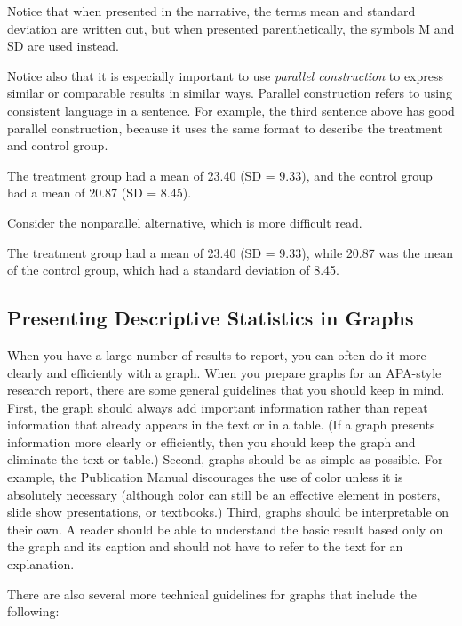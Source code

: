 Notice that when presented in the narrative, the terms mean and standard deviation are written out, but when presented parenthetically, the symbols M and SD are used instead. 

Notice also that it is especially important to use \emph{parallel construction} to express similar or comparable results in similar ways. Parallel construction refers to using consistent language in a sentence. For example, the third sentence above has good parallel construction, because it uses the same format to describe the treatment and control group.

\begin{kframe}
The treatment group had a mean of 23.40 (SD = 9.33), and the control group had a mean of 20.87 (SD = 8.45).
\end{kframe}

Consider the nonparallel alternative, which is more difficult read.

\begin{kframe}
The treatment group had a mean of 23.40 (SD = 9.33), while 20.87 was the mean of the control group, which had a standard deviation of 8.45.
\end{kframe}

\subsection{Presenting Descriptive Statistics in Graphs}

When you have a large number of results to report, you can often do it more clearly and efficiently with a graph. When you prepare graphs for an APA-style research report, there are some general guidelines that you should keep in mind. First, the graph should always add important information rather than repeat information that already appears in the text or in a table. (If a graph presents information more clearly or efficiently, then you should keep the graph and eliminate the text or table.) Second, graphs should be as simple as possible. For example, the Publication Manual discourages the use of color unless it is absolutely necessary (although color can still be an effective element in posters, slide show presentations, or textbooks.) Third, graphs should be interpretable on their own. A reader should be able to understand the basic result based only on the graph and its caption and should not have to refer to the text for an explanation.


There are also several more technical guidelines for graphs that include the following:


